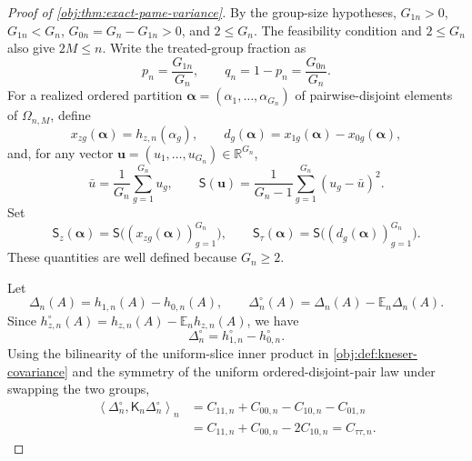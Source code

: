\begin{proof}[Proof of \cref{obj:thm:exact-pame-variance}]
By the group-size hypotheses, \(G_{1n}>0\), \(G_{1n}<G_n\), \(G_{0n}=G_n-G_{1n}>0\), and \(2\le G_n\). The feasibility condition and \(2\le G_n\) also give \(2M\le n\). Write the treated-group fraction as
\[
p_n=\frac{G_{1n}}{G_n},
\qquad
q_n=1-p_n=\frac{G_{0n}}{G_n}.
\]
For a realized ordered partition
\(\boldsymbol\alpha=(\alpha_1,\ldots,\alpha_{G_n})\) of pairwise-disjoint elements of
\(\Omega_{n,M}\), define
\[
x_{zg}(\boldsymbol\alpha)=h_{z,n}(\alpha_g),\qquad
d_g(\boldsymbol\alpha)=x_{1g}(\boldsymbol\alpha)-x_{0g}(\boldsymbol\alpha),
\]
and, for any vector \(\mathbf u=(u_1,\ldots,u_{G_n})\in\mathbb R^{G_n}\),
\[
\bar u=\frac1{G_n}\sum_{g=1}^{G_n}u_g,
\qquad
\mathsf S(\mathbf u)=\frac1{G_n-1}\sum_{g=1}^{G_n}(u_g-\bar u)^2 .
\]
Set
\[
\mathsf S_z(\boldsymbol\alpha)=\mathsf S\bigl((x_{zg}(\boldsymbol\alpha))_{g=1}^{G_n}\bigr),
\qquad
\mathsf S_\tau(\boldsymbol\alpha)=\mathsf S\bigl((d_g(\boldsymbol\alpha))_{g=1}^{G_n}\bigr).
\]
These quantities are well defined because \(G_n\ge2\). %

Let
\[
\Delta_n(A)=h_{1,n}(A)-h_{0,n}(A),
\qquad
\Delta_n^\circ(A)=\Delta_n(A)-\mathbb E_n\Delta_n(A).
\]
Since \(h_{z,n}^\circ(A)=h_{z,n}(A)-\mathbb E_n h_{z,n}(A)\), we have
\[
\Delta_n^\circ=h_{1,n}^\circ-h_{0,n}^\circ .
\]
Using the bilinearity of the uniform-slice inner product in \cref{obj:def:kneser-covariance} and the symmetry of the uniform ordered-disjoint-pair law under swapping the two groups,
\[
\begin{aligned}
\left\langle \Delta_n^\circ,\mathsf K_n\Delta_n^\circ\right\rangle_n
&=
C_{11,n}+C_{00,n}-C_{10,n}-C_{01,n}  \\
&=
C_{11,n}+C_{00,n}-2C_{10,n}
=
C_{\tau\tau,n}.
\end{aligned}
\]


\end{proof}
